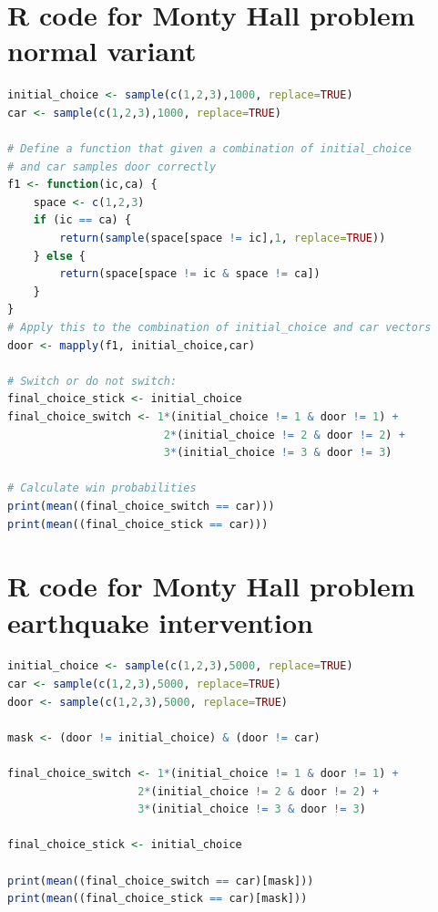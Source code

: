\section*{R code for Monty Hall problem normal variant}
\begin{lstlisting}[language=R]
initial_choice <- sample(c(1,2,3),1000, replace=TRUE)
car <- sample(c(1,2,3),1000, replace=TRUE)

# Define a function that given a combination of initial_choice 
# and car samples door correctly
f1 <- function(ic,ca) {
    space <- c(1,2,3)
    if (ic == ca) {
        return(sample(space[space != ic],1, replace=TRUE))
    } else {
        return(space[space != ic & space != ca])
    }
}
# Apply this to the combination of initial_choice and car vectors
door <- mapply(f1, initial_choice,car)

# Switch or do not switch:
final_choice_stick <- initial_choice
final_choice_switch <- 1*(initial_choice != 1 & door != 1) + 
                        2*(initial_choice != 2 & door != 2) + 
                        3*(initial_choice != 3 & door != 3)

# Calculate win probabilities
print(mean((final_choice_switch == car)))
print(mean((final_choice_stick == car)))
  \end{lstlisting}
  \section*{R code for Monty Hall problem earthquake intervention}
  \begin{lstlisting}[language=R]
initial_choice <- sample(c(1,2,3),5000, replace=TRUE)
car <- sample(c(1,2,3),5000, replace=TRUE)
door <- sample(c(1,2,3),5000, replace=TRUE)

mask <- (door != initial_choice) & (door != car) 

final_choice_switch <- 1*(initial_choice != 1 & door != 1) + 
                    2*(initial_choice != 2 & door != 2) + 
                    3*(initial_choice != 3 & door != 3)

final_choice_stick <- initial_choice

print(mean((final_choice_switch == car)[mask]))
print(mean((final_choice_stick == car)[mask]))
\end{lstlisting}

